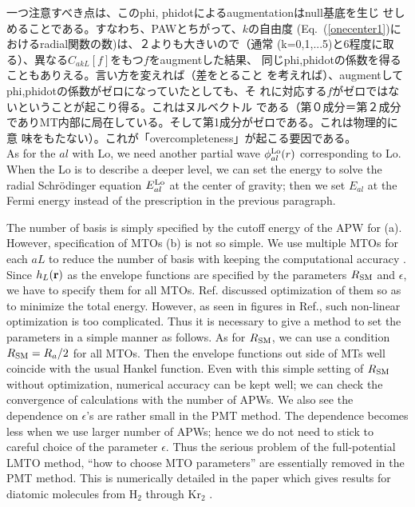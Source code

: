 \documentclass[a4paper,10pt,aip,onecolumn,amsmath,amssymb,floatfix,rmp]{revtex4-1}
\newcommand{\bfr}{{\bf r}}
\newcommand{\req}[1]{\mbox{Eq.~\!(\ref{#1})}}
\def\RSM{R_{\rm SM}}
\def\CakL{C_{akL}}
\begin{document}
\begin{widetext}
一つ注意すべき点は、このphi, phidotによるaugmentationはnull基底を生じ
せしめることである。すなわち、PAWとちがって、$k$の自由度
(\req{onecenter1}におけるradial関数の数)は、２よりも大きいので（通常
(k=0,1,...5)と6程度に取る）、異なる$\CakL[f]$をもつ$f$をaugmentした結果、
同じphi,phidotの係数を得ることもありえる。言い方を変えれば（差をとること
を考えれば）、augmentしてphi,phidotの係数がゼロになっていたとしても、そ
れに対応する$f$がゼロではないということが起こり得る。これはヌルベクトル
である（第０成分＝第２成分でありMT内部に局在している。そして第1成分がゼロである。これは物理的に意
味をもたない）。これが「overcompleteness」が起こる要因である。\\

As for the $al$ with Lo, we need another partial wave $\phi^{\rm
Lo}_{al}(r)$ corresponding to Lo.  When the Lo is to describe a deeper
level, we can set the energy to solve the radial Schr\"odinger equation
$E^{\rm Lo}_{al}$ at the center of gravity; then we set $E_{al}$ at the
Fermi energy instead of the prescription in the previous paragraph.

The number of basis is simply specified by the cutoff energy of the APW
for (a). However, specification of MTOs (b) is not so simple.  
We use multiple MTOs for each $aL$ to reduce the number of basis with 
keeping the computational accuracy \cite{pmt1}.
Since $h_L(\bfr)$ as the envelope functions are specified 
by the parameters $\RSM$ and $\epsilon$, we have to specify them for
all MTOs. Ref.\cite{lmfchap} discussed optimization of them so as
to minimize the total energy. However, as seen in figures in
Ref.\cite{lmfchap}, such non-linear optimization is too complicated.
Thus it is necessary to give a method to set the parameters 
in a simple manner as follows. 
As for $\RSM$, we can use a condition $\RSM= R_a/2$ for all MTOs. 
Then the envelope functions out side of MTs well coincide with
the usual Hankel function. 
Even with this simple setting of $\RSM$ without optimization,
numerical accuracy can be kept well; we can check the
convergence of calculations with the number of APWs.
We also see the dependence on $\epsilon$'s are rather small
in the PMT method. The dependence becomes less when we use larger
number of APWs; hence we do not need to stick to careful choice of
the parameter $\epsilon$.
Thus the serious problem of the full-potential LMTO method, ``how
to choose MTO parameters'' are essentially removed in the PMT
method. This is numerically detailed in the paper which gives results for
diatomic molecules from H$_2$ through Kr$_2$ \cite{kotanimol2011}.


\end{widetext}
\end{document}
